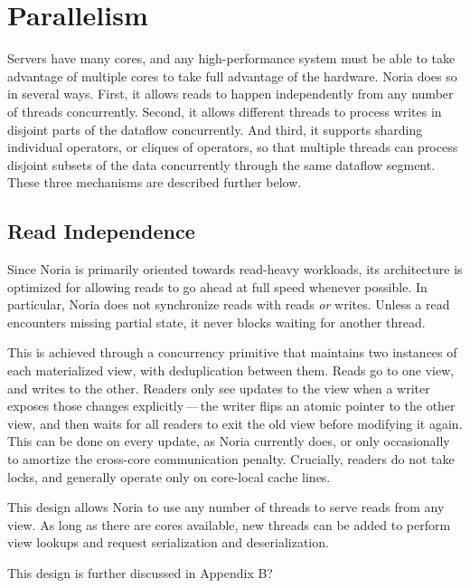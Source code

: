 \section{Parallelism}

Servers have many cores, and any high-performance system must be able to take
advantage of multiple cores to take full advantage of the hardware. Noria does
so in several ways. First, it allows reads to happen independently from any
number of threads concurrently. Second, it allows different threads to process
writes in disjoint parts of the dataflow concurrently. And third, it supports
sharding individual operators, or cliques of operators, so that multiple threads
can process disjoint subsets of the data concurrently through the same dataflow
segment. These three mechanisms are described further below.

\subsection{Read Independence}

Since Noria is primarily oriented towards read-heavy workloads, its architecture
is optimized for allowing reads to go ahead at full speed whenever possible. In
particular, Noria does not synchronize reads with reads \emph{or} writes. Unless
a read encounters missing partial state, it never blocks waiting for another
thread.

This is achieved through a concurrency primitive that maintains two instances of
each materialized view, with deduplication between them. Reads go to one view,
and writes to the other. Readers only see updates to the view when a writer
exposes those changes explicitly\,---\,the writer flips an atomic pointer to the
other view, and then waits for all readers to exit the old view before modifying
it again. This can be done on every update, as Noria currently does, or only
occasionally to amortize the cross-core communication penalty. Crucially,
readers do not take locks, and generally operate only on core-local cache lines.

This design allows Noria to use any number of threads to serve reads from any
view. As long as there are cores available, new threads can be added to perform
view lookups and request serialization and deserialization.

\begin{inprogress}
  This design is further discussed in Appendix B?
\end{inprogress}

